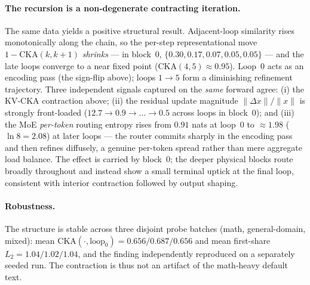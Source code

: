 \paragraph{The recursion is a non-degenerate contracting iteration.} The same
data yields a positive structural result. Adjacent-loop similarity rises
monotonically along the chain, so the per-step representational move
$1-\mathrm{CKA}(k,k{+}1)$ \emph{shrinks} --- in block~0,
$\{0.30, 0.17, 0.07, 0.05, 0.05\}$ --- and the late loops converge to a near
fixed point ($\mathrm{CKA}(4,5)\!\approx\!0.95$). Loop~0 acts as an encoding pass
(the sign-flip above); loops $1{\to}5$ form a diminishing refinement trajectory.
Three independent signals captured on the \emph{same} forward agree: (i) the
KV-CKA contraction above; (ii) the residual update magnitude
$\lVert\Delta x\rVert/\lVert x\rVert$ is strongly front-loaded
($12.7 \to 0.9 \to \dots \to 0.5$ across loops in block~0); and (iii) the MoE
\emph{per-token} routing entropy rises from $0.91$ nats at loop~0 to
$\approx\!1.98$ ($\ln 8 = 2.08$) at later loops --- the router commits sharply in
the encoding pass and then refines diffusely, a genuine per-token spread rather
than mere aggregate load balance. The effect is carried by block~0; the deeper
physical blocks route broadly throughout and instead show a small terminal
uptick at the final loop, consistent with interior contraction followed by
output shaping.

\paragraph{Robustness.} The structure is stable across three disjoint probe
batches (math, general-domain, mixed): mean $\mathrm{CKA}(\cdot,\text{loop}_0) =
0.656 / 0.687 / 0.656$ and mean first-share $L_2 = 1.04 / 1.02 / 1.04$, and the
finding independently reproduced on a separately seeded run. The contraction is
thus not an artifact of the math-heavy default text.

